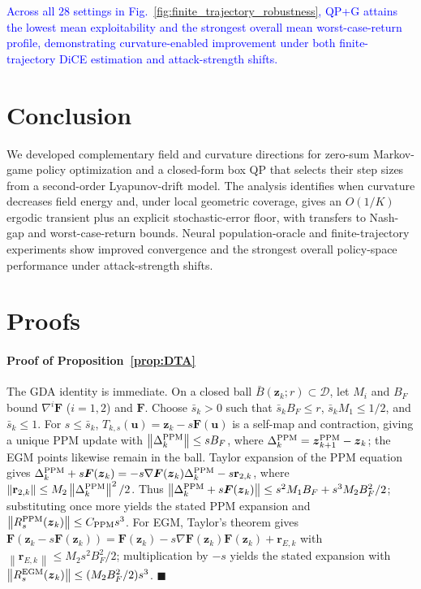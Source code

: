 \documentclass[journal]{IEEEtran}
\theoremstyle{remark}
\newcommand{\norm}[1]{\left\lVert #1\right\rVert}
\newcommand{\cD}{\mathcal{D}}
\newcommand{\bz}{\boldsymbol{z}}
\newcommand{\bu}{\boldsymbol{u}}
\newcommand{\bF}{\boldsymbol{F}}
\begin{document}
\textcolor{blue}{Across all $28$ settings in Fig.~\ref{fig:finite_trajectory_robustness}, QP+G attains the lowest mean exploitability and the strongest overall mean worst-case-return profile, demonstrating curvature-enabled improvement under both finite-trajectory DiCE estimation and attack-strength shifts.}

	\section{Conclusion}
	We developed complementary field and curvature directions for zero-sum Markov-game policy optimization and a closed-form box QP that selects their step sizes from a second-order Lyapunov-drift model.
	The analysis identifies when curvature decreases field energy and, under local geometric coverage, gives an $O(1/K)$ ergodic transient plus an explicit stochastic-error floor, with transfers to Nash-gap and worst-case-return bounds.
	Neural population-oracle and finite-trajectory experiments show improved convergence and the strongest overall policy-space performance under attack-strength shifts.
	
\appendices
	
	\section{Proofs}\label{app:proofs}
\paragraph{Proof of Proposition~\ref{prop:DTA}}\label{app:DTA}
	The GDA identity is immediate. On a closed ball $\bar B(\bz_k;r)\subset\cD$, let $M_i$ and $B_F$ bound $\nabla^i\bF$ ($i=1,2$) and $\bF$.
	Choose $\bar s_k>0$ such that $\bar s_k B_F\le r$, $\bar s_k M_1\le1/2$, and $\bar s_k\le1$.
	For $s\le\bar s_k$, $T_{k,s}(\bu)=\bz_k-s\bF(\bu)$ is a self-map and contraction, giving a unique PPM update with $\norm{\Delta_k^{\rm PPM}}\le sB_F$, where $\Delta_k^{\rm PPM}=\bz_{k+1}^{\rm PPM}-\bz_k$; the EGM points likewise remain in the ball.
	Taylor expansion of the PPM equation gives $\Delta_k^{\rm PPM}+s\bF(\bz_k)=-s\nabla\bF(\bz_k)\Delta_k^{\rm PPM}-s\mathbf r_{2,k}$, where $\norm{\mathbf r_{2,k}}\le M_2\norm{\Delta_k^{\rm PPM}}^2/2$.
	Thus $\norm{\Delta_k^{\rm PPM}+s\bF(\bz_k)}\le s^2M_1B_F+s^3M_2B_F^2/2$; substituting once more yields the stated PPM expansion and $\norm{R_s^{\rm PPM}(\bz_k)}\le C_{\rm PPM}s^3$.
	For EGM, Taylor's theorem gives $\bF(\bz_k-s\bF(\bz_k))=\bF(\bz_k)-s\nabla\bF(\bz_k)\bF(\bz_k)+\mathbf r_{E,k}$ with $\norm{\mathbf r_{E,k}}\le M_2s^2B_F^2/2$; multiplication by $-s$ yields the stated expansion with $\norm{R_s^{\rm EGM}(\bz_k)}\le(M_2B_F^2/2)s^3$.
	\hfill$\blacksquare$
	
\end{document}
